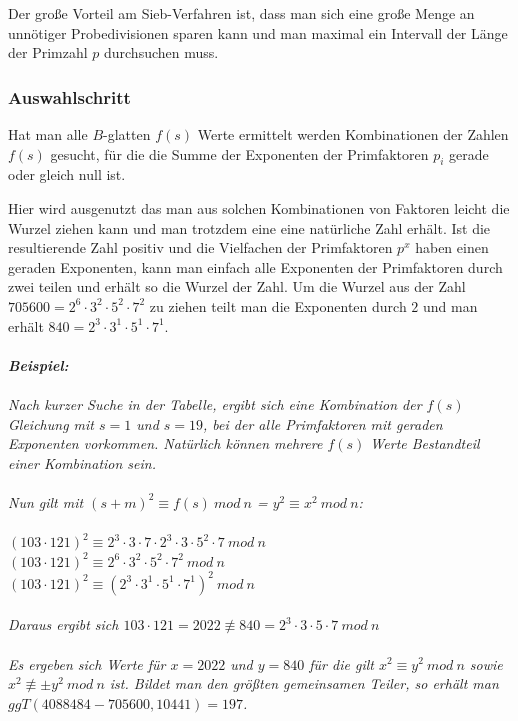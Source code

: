 \documentclass[a4paper,11pt]{article}
\begin{document}
Der große Vorteil am Sieb-Verfahren ist, dass man sich eine große
Menge an unnötiger Probedivisionen sparen kann und man maximal
ein Intervall der Länge der Primzahl $p$ durchsuchen muss.

\subsubsection*{Auswahlschritt}
Hat man alle $B$-glatten $f(s)$ Werte ermittelt werden Kombinationen
der Zahlen $f(s)$ gesucht, für die die Summe der Exponenten der
Primfaktoren $p_i$ gerade oder gleich null ist.

Hier wird ausgenutzt das man aus solchen Kombinationen von Faktoren
leicht die Wurzel ziehen kann und man trotzdem eine eine natürliche
Zahl erhält. Ist die resultierende Zahl positiv und die Vielfachen
der Primfaktoren $p^x$ haben einen geraden Exponenten, kann man einfach
alle Exponenten der Primfaktoren durch zwei teilen und erhält so
die Wurzel der Zahl.
Um die Wurzel aus der Zahl $705600 = 2^6\cdot3^2\cdot5^2\cdot7^2$
zu ziehen teilt man die Exponenten durch $2$ und man erhält
$ 840 = 2^3\cdot3^1\cdot5^1\cdot7^1$.\\\\
{\it
\textbf{Beispiel:}\\\\
Nach kurzer Suche in der Tabelle, ergibt sich eine Kombination
der $f(s)$ Gleichung mit $s=1$ und $s=19$, bei der alle
Primfaktoren mit geraden Exponenten vorkommen. Natürlich
können mehrere $f(s)$ Werte Bestandteil einer Kombination
sein. \\\\
Nun gilt mit $(s+m)^2 \equiv f(s)\ mod\ n$ = $y^2 \equiv x^2\ mod\ n$:\\\\
$(103\cdot121)^2\equiv2^3\cdot3\cdot7\cdot2^3\cdot3\cdot5^2\cdot7\ mod\ n$\\
$(103\cdot121)^2\equiv2^6\cdot3^2\cdot5^2\cdot7^2\ mod\ n$\\
$(103\cdot121)^2\equiv(2^3\cdot3^1\cdot5^1\cdot7^1)^2\ mod\ n$\\\\
Daraus ergibt sich $103\cdot121 = 2022\not\equiv840 = 2^3\cdot3\cdot5\cdot7\ mod\ n$\\\\
Es ergeben sich Werte für $x = 2022$ und $y=840$ für die gilt $x^2\equiv y^2\ mod\ n$
sowie $x^2\not\equiv\pm y^2\ mod\ n$ ist. Bildet man den größten gemeinsamen Teiler,
so erhält man $ggT(4088484-705600, 10441) = 197$.
}
\end{document}

